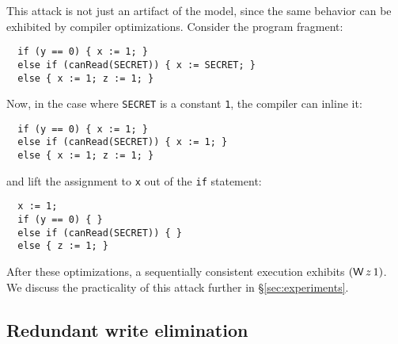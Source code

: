 This attack is not just an artifact of the model,
since the same behavior can be exhibited by
compiler optimizations. Consider the program fragment:
\begin{verbatim}
  if (y == 0) { x := 1; }
  else if (canRead(SECRET)) { x := SECRET; }
  else { x := 1; z := 1; }
\end{verbatim}
Now, in the case where \verb|SECRET| is a constant \verb|1|,
the compiler can inline it:
\begin{verbatim}
  if (y == 0) { x := 1; }
  else if (canRead(SECRET)) { x := 1; }
  else { x := 1; z := 1; }
\end{verbatim}
and lift the assignment to \verb|x| out of the \verb|if| statement:
\begin{verbatim}
  x := 1;
  if (y == 0) { }
  else if (canRead(SECRET)) { }
  else { z := 1; }
\end{verbatim}
After these optimizations, a sequentially consistent execution
exhibits $(\DW{z}{1})$. We discuss the practicality of this attack
further in \S\ref{sec:experiments}.

\subsection{Redundant write elimination}


